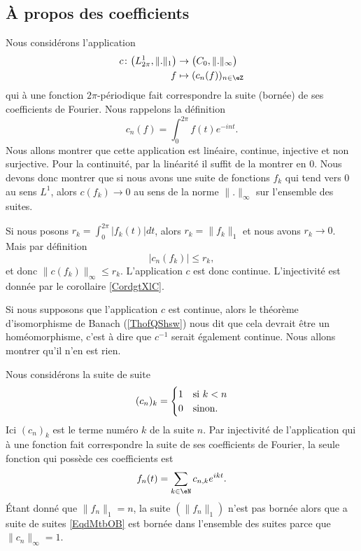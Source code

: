 \subsection{À propos des coefficients}

Nous considérons l'application
\begin{equation}
    \begin{aligned}
        c\colon \big( L^1_{2\pi},\| . \|_1 \big)&\to \big( C_0,\| .\|_{\infty} \big) \\
        f&\mapsto (c_n(f))_{n\in \eZ} 
    \end{aligned}
\end{equation}
qui à une fonction \( 2\pi\)-périodique fait correspondre la suite (bornée) de ses coefficients de Fourier. Nous rappelons la définition
\begin{equation}
    c_n(f)=\int_0^{2\pi}f(t) e^{-int}.
\end{equation}
Nous allons montrer que cette application est linéaire, continue, injective et non surjective. Pour la continuité, par la linéarité il suffit de la montrer en \( 0\). Nous devons donc montrer que si nous avons une suite de fonctions \( f_k\) qui tend vers \( 0\) au sens \( L^1\), alors \( c(f_k)\to 0\) au sens de la norme \( \| . \|_{\infty}\) sur l'ensemble des suites.

Si nous posons \( r_k=\int_0^{2\pi}| f_k(t) |dt\), alors \( r_k=\| f_k \|_1\) et nous avons \( r_k\to 0\). Mais par définition
\begin{equation}
    | c_n(f_k) |\leq r_k,
\end{equation}
et donc \( \| c(f_k) \|_{\infty}\leq r_k\). L'application \( c\) est donc continue. L'injectivité est donnée par le corollaire \ref{CordgtXlC}. 

Si nous supposons que l'application \( c\) est continue, alors le théorème d'isomorphisme de Banach (\ref{ThofQShsw}) nous dit que cela devrait être un homéomorphisme, c'est à dire que \( c^{-1}\) serait également continue. Nous allons montrer qu'il n'en est rien.

Nous considérons la suite de suite
\begin{equation}    \label{EqdMtbOB}
    (c_n)_k=\begin{cases}
        1    &   \text{si \( k<n\)}\\
        0    &    \text{sinon}.
    \end{cases}
\end{equation}
Ici \( (c_n)_k\) est le terme numéro \( k\) de la suite \( n\). Par injectivité de l'application qui à une fonction fait correspondre la suite de ses coefficients de Fourier, la seule fonction qui possède ces coefficients est
\begin{equation}
    f_n(t)=\sum_{k\in \eN}c_{n,k} e^{ikt}.
\end{equation}
Étant donné que \( \| f_n \|_1=n\), la suite \( (\| f_n \|_1)\) n'est pas bornée alors que a suite de suites \eqref{EqdMtbOB} est bornée dans l'ensemble des suites parce que \( \| c_n \|_{\infty}=1\).



